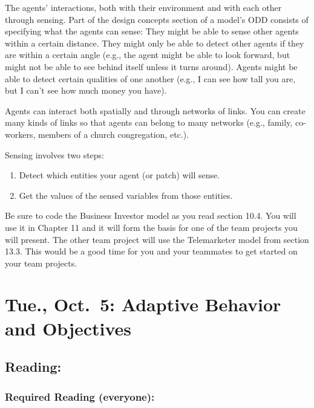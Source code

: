 \documentclass[
]{article}
\providecommand{\tightlist}{%
  \setlength{\itemsep}{0pt}\setlength{\parskip}{0pt}}
\begin{document}
The agents' interactions, both with their environment and with each
other through sensing. Part of the design concepts section of a model's
ODD consists of specifying what the agents can sense: They might be able
to sense other agents within a certain distance. They might only be able
to detect other agents if they are within a certain angle (e.g., the
agent might be able to look forward, but might not be able to see behind
itself unless it turns around). Agents might be able to detect certain
qualities of one another (e.g., I can see how tall you are, but I can't
see how much money you have).

Agents can interact both spatially and through networks of links. You
can create many kinds of links so that agents can belong to many
networks (e.g., family, co-workers, members of a church congregation,
etc.).

Sensing involves two steps:

\begin{enumerate}
\def\labelenumi{\arabic{enumi}.}
\tightlist
\item
  Detect which entities your agent (or patch) will sense.
\item
  Get the values of the sensed variables from those entities.
\end{enumerate}

Be sure to code the Business Investor model as you read section 10.4.
You will use it in Chapter 11 and it will form the basis for one of the
team projects you will present. The other team project will use the
Telemarketer model from section 13.3. This would be a good time for you
and your teammates to get started on your team projects.

\hypertarget{tue.-oct.-5-adaptive-behavior-and-objectives}{%
\section{Tue., Oct.~5: Adaptive Behavior and
Objectives}\label{tue.-oct.-5-adaptive-behavior-and-objectives}}

\hypertarget{reading-11}{%
\subsection{Reading:}\label{reading-11}}

\hypertarget{required-reading-everyone-10}{%
\subsubsection{Required Reading
(everyone):}\label{required-reading-everyone-10}}
\end{document}
